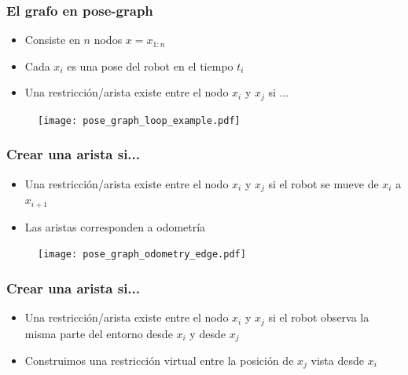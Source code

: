\begin{frame}
	\frametitle{El grafo en pose-graph}
	
	\begin{itemize}
		\item Consiste en $n$ nodos $x=x_{1:n}$
		\item Cada $x_{i}$ es una pose del robot en el tiempo $t_{i}$
		\item Una restricción/arista existe entre el nodo $x_{i}$ y $x_{j}$ si ...
	\end{itemize}
	
 	\begin{figure}[!h]
		\texttt{[image: pose\_graph\_loop\_example.pdf]}
	\end{figure}
	
\end{frame}

\begin{frame}
	\frametitle{Crear una arista si...}
	
	\begin{itemize}
		\item Una restricción/arista existe entre el nodo $x_{i}$ y $x_{j}$ si el robot se mueve de $x_{i}$ a $x_{i+1}$
		\item Las aristas corresponden a odometría
	\end{itemize}
	
	\begin{figure}[!h]
		\texttt{[image: pose\_graph\_odometry\_edge.pdf]}
	\end{figure}
	
\end{frame}


\begin{frame}
	\frametitle{Crear una arista si...}
	
	\begin{itemize}
		\item<1-> Una restricción/arista existe entre el nodo $x_{i}$ y $x_{j}$ si el robot observa la misma parte del entorno desde $x_{i}$ y desde $x_{j}$
		\item<2>  Construimos una restricción virtual entre la posición de $x_{j}$ vista desde $x_{i}$
	\end{itemize}
	
\end{frame}


